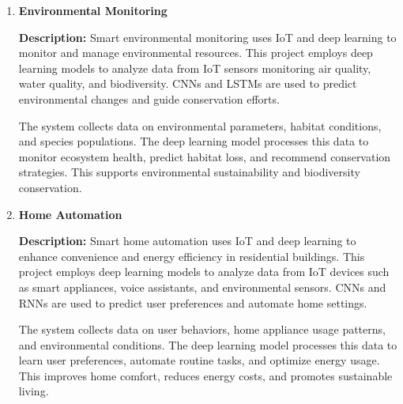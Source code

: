 \documentclass{article}
\begin{document}
\begin{enumerate}[label=\textbf{\arabic*.}, leftmargin=*]


\vspace{24pt} %
\item \textbf{Environmental Monitoring}

\textbf{Description:}
Smart environmental monitoring uses IoT and deep learning to monitor and manage environmental resources. This project employs deep learning models to analyze data from IoT sensors monitoring air quality, water quality, and biodiversity. CNNs and LSTMs are used to predict environmental changes and guide conservation efforts.

The system collects data on environmental parameters, habitat conditions, and species populations. The deep learning model processes this data to monitor ecosystem health, predict habitat loss, and recommend conservation strategies. This supports environmental sustainability and biodiversity conservation.



\vspace{24pt} %
\item \textbf{Home Automation}

\textbf{Description:}
Smart home automation uses IoT and deep learning to enhance convenience and energy efficiency in residential buildings. This project employs deep learning models to analyze data from IoT devices such as smart appliances, voice assistants, and environmental sensors. CNNs and RNNs are used to predict user preferences and automate home settings.

The system collects data on user behaviors, home appliance usage patterns, and environmental conditions. The deep learning model processes this data to learn user preferences, automate routine tasks, and optimize energy usage. This improves home comfort, reduces energy costs, and promotes sustainable living.



\end{enumerate}
\end{document}
